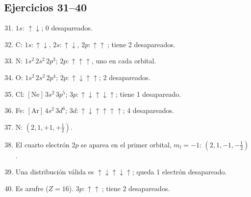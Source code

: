 \documentclass[12pt, letterpaper]{article}
\begin{document}
\subsection*{Ejercicios 31--40}
\begin{enumerate}[leftmargin=*, label=\textbf{\arabic*.}]
  \setcounter{enumi}{30}
  \item $1s:\ \boxed{\uparrow\downarrow}$; 0 desapareados.
  \item C: $1s:\boxed{\uparrow\downarrow}$, $2s:\boxed{\uparrow\downarrow}$, $2p:\boxed{\uparrow}\boxed{\uparrow}\boxed{\ }$; tiene 2 desapareados.
  \item N: $1s^2\,2s^2\,2p^3$; $2p:\boxed{\uparrow}\boxed{\uparrow}\boxed{\uparrow}$, uno en cada orbital.
  \item O: $1s^2\,2s^2\,2p^4$; $2p:\boxed{\uparrow\downarrow}\boxed{\uparrow}\boxed{\uparrow}$; 2 desapareados.
  \item Cl: $[\mathrm{Ne}]\,3s^2\,3p^5$; $3p:\boxed{\uparrow\downarrow}\boxed{\uparrow\downarrow}\boxed{\uparrow}$; tiene 1 desapareado.
  \item Fe: $[\mathrm{Ar}]\,4s^2\,3d^6$; $3d:\boxed{\uparrow\downarrow}\boxed{\uparrow}\boxed{\uparrow}\boxed{\uparrow}\boxed{\uparrow}$; 4 desapareados.
  \item N: $(2,1,+1,+\tfrac12)$.
  \item El cuarto electrón $2p$ se aparea en el primer orbital, $m_l=-1$: $(2,1,-1,-\tfrac12)$.
  \item Una distribución válida es $\boxed{\uparrow\downarrow}\boxed{\uparrow\downarrow}\boxed{\uparrow}$; queda 1 electrón desapareado.
  \item Es azufre ($Z=16$). $3p:\boxed{\uparrow}\boxed{\uparrow}\boxed{\ }$; tiene 2 desapareados.
\end{enumerate}
\end{document}
